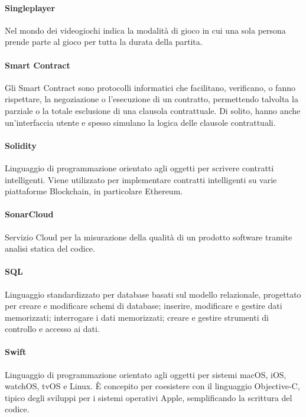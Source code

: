 \documentclass[]{article}
\begin{document}
	\paragraph*{Singleplayer}
	Nel mondo dei videogiochi indica la modalità di gioco in cui una sola persona prende parte al gioco per tutta la durata della partita.

	\paragraph*{Smart Contract}
	Gli Smart Contract sono protocolli informatici che facilitano, verificano, o fanno rispettare, la negoziazione o l'esecuzione di un contratto, permettendo talvolta la parziale o la totale esclusione di una clausola contrattuale. Di solito, hanno anche un'interfaccia utente e spesso simulano la logica delle clausole contrattuali.

	\paragraph*{Solidity}
	Linguaggio di programmazione orientato agli oggetti per scrivere contratti intelligenti. Viene utilizzato per implementare contratti intelligenti su varie piattaforme Blockchain, in particolare Ethereum.

    \paragraph*{SonarCloud}
    Servizio Cloud per la misurazione della qualità di un prodotto software tramite analisi statica del codice.

	\paragraph*{SQL}
	Linguaggio standardizzato per database basati sul modello relazionale, progettato per creare e modificare schemi di database; inserire, modificare e gestire dati memorizzati; interrogare i dati memorizzati; creare e gestire strumenti di controllo e accesso ai dati.

	\paragraph*{Swift}
	Linguaggio di programmazione orientato agli oggetti per sistemi macOS, iOS, watchOS, tvOS e Linux. È concepito per coesistere con il linguaggio Objective-C, tipico degli sviluppi per i sistemi operativi Apple, semplificando la scrittura del codice.
	
\end{document}
